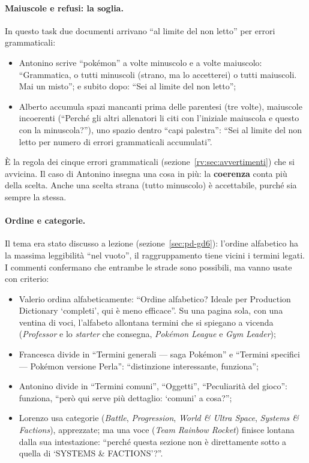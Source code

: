 \paragraph{Maiuscole e refusi: la soglia.} In questo task due documenti
arrivano ``al limite del non letto'' per errori grammaticali:
\begin{itemize}
  \item Antonino scrive ``pokémon'' a volte minuscolo e a volte maiuscolo:
        ``Grammatica, o tutti minuscoli (strano, ma lo accetterei) o tutti
        maiuscoli. Mai un misto''; e subito dopo: ``Sei al limite del non
        letto'';
  \item Alberto accumula spazi mancanti prima delle parentesi (tre volte),
        maiuscole incoerenti (``Perché gli altri allenatori li citi con
        l'iniziale maiuscola e questo con la minuscola?''), uno spazio dentro
        ``capi palestra'': ``Sei al limite del non letto per numero di errori
        grammaticali accumulati''.
\end{itemize}
È la regola dei cinque errori grammaticali (sezione~\ref{rv:sec:avvertimenti})
che si avvicina. Il caso di Antonino insegna una cosa in più: la
\textbf{coerenza} conta più della scelta. Anche una scelta strana (tutto
minuscolo) è accettabile, purché sia sempre la stessa.

\paragraph{Ordine e categorie.} Il tema era stato discusso a lezione
(sezione~\ref{sec:pd-gd6}): l'ordine alfabetico ha la massima leggibilità ``nel
vuoto'', il raggruppamento tiene vicini i termini legati. I commenti
confermano che entrambe le strade sono possibili, ma vanno usate con criterio:
\begin{itemize}
  \item Valerio ordina alfabeticamente: ``Ordine alfabetico? Ideale per
        Production Dictionary `completi', qui è meno efficace''. Su una pagina
        sola, con una ventina di voci, l'alfabeto allontana termini che si
        spiegano a vicenda (\emph{Professor} e lo \emph{starter} che
        consegna, \emph{Pokémon League} e \emph{Gym Leader});
  \item Francesca divide in ``Termini generali --- saga Pokémon'' e ``Termini
        specifici --- Pokémon versione Perla'': ``distinzione interessante,
        funziona'';
  \item Antonino divide in ``Termini comuni'', ``Oggetti'', ``Peculiarità del
        gioco'': funziona, ``però qui serve più dettaglio: `comuni' a cosa?'';
  \item Lorenzo usa categorie (\emph{Battle}, \emph{Progression}, \emph{World
        \& Ultra Space}, \emph{Systems \& Factions}), apprezzate; ma una voce
        (\emph{Team Rainbow Rocket}) finisce lontana dalla sua intestazione: ``perché questa sezione non è direttamente sotto a quella
        di `SYSTEMS \& FACTIONS'?''.
\end{itemize}

